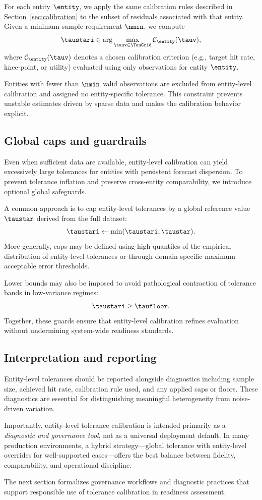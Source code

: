 For each entity $\entity$, we apply the same calibration rules described in
Section~\ref{sec:calibration} to the subset of residuals associated with that
entity.
Given a minimum sample requirement $\nmin$, we compute
\[
    \taustari
    \in
    \arg\max_{\tauv \in \TauGrid}
    \mathcal{C}_{\entity}(\tauv),
\]
where $\mathcal{C}_{\entity}(\tauv)$ denotes a chosen calibration criterion
(e.g., target hit rate, knee-point, or utility) evaluated using only observations
for entity $\entity$.

Entities with fewer than $\nmin$ valid observations are excluded from
entity-level calibration and assigned no entity-specific tolerance.
This constraint prevents unstable estimates driven by sparse data and makes the
calibration behavior explicit.

\subsection{Global caps and guardrails}
\label{subsec:entity_safeguards}

Even when sufficient data are available, entity-level calibration can yield
excessively large tolerances for entities with persistent forecast dispersion.
To prevent tolerance inflation and preserve cross-entity comparability, we
introduce optional global safeguards.

A common approach is to cap entity-level tolerances by a global reference value
$\taustar$ derived from the full dataset:
\[
    \taustari \leftarrow \min(\taustari, \taustar).
\]
More generally, caps may be defined using high quantiles of the empirical
distribution of entity-level tolerances or through domain-specific maximum
acceptable error thresholds.

Lower bounds may also be imposed to avoid pathological contraction of tolerance
bands in low-variance regimes:
\[
    \taustari \ge \taufloor.
\]
Together, these guards ensure that entity-level calibration refines evaluation
without undermining system-wide readiness standards.

\subsection{Interpretation and reporting}
\label{subsec:entity_interpretation}

Entity-level tolerances should be reported alongside diagnostics including sample
size, achieved hit rate, calibration rule used, and any applied caps or floors.
These diagnostics are essential for distinguishing meaningful heterogeneity from
noise-driven variation.

Importantly, entity-level tolerance calibration is intended primarily as a
\emph{diagnostic and governance tool}, not as a universal deployment default.
In many production environments, a hybrid strategy—global tolerance with
entity-level overrides for well-supported cases—offers the best balance between
fidelity, comparability, and operational discipline.

The next section formalizes governance workflows and diagnostic practices that
support responsible use of tolerance calibration in readiness assessment.
